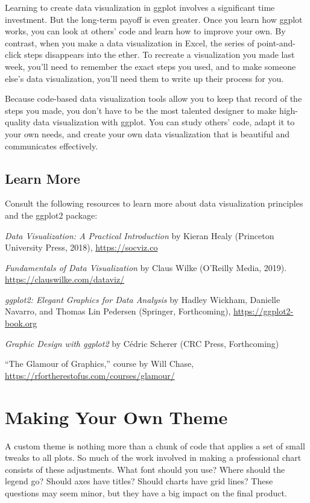 \documentclass[
]{book}
\begin{document}
Learning to create data visualization in ggplot involves a significant time investment. But the long-term payoff is even greater. Once you learn how ggplot works, you can look at others' code and learn how to improve your own. By contrast, when you make a data visualization in Excel, the series of point-and-click steps disappears into the ether. To recreate a visualization you made last week, you'll need to remember the exact steps you used, and to make someone else's data visualization, you'll need them to write up their process for you.

Because code-based data visualization tools allow you to keep that record of the steps you made, you don't have to be the most talented designer to make high-quality data visualization with ggplot. You can study others' code, adapt it to your own needs, and create your own data visualization that is beautiful and communicates effectively.

\hypertarget{learn-more-1}{%
\section*{Learn More}\label{learn-more-1}}

Consult the following resources to learn more about data visualization principles and the ggplot2 package:

\emph{Data Visualization: A Practical Introduction} by Kieran Healy (Princeton University Press, 2018), \url{https://socviz.co}

\emph{Fundamentals of Data Visualization} by Claus Wilke (O'Reilly Media, 2019). \url{https://clauswilke.com/dataviz/}

\emph{ggplot2: Elegant Graphics for Data Analysis} by Hadley Wickham, Danielle Navarro, and Thomas Lin Pedersen (Springer, Forthcoming), \url{https://ggplot2-book.org}

\emph{Graphic Design with ggplot2} by Cédric Scherer (CRC Press, Forthcoming)

``The Glamour of Graphics,'' course by Will Chase, \url{https://rfortherestofus.com/courses/glamour/}

\hypertarget{custom-theme-chapter}{%
\chapter{Making Your Own Theme}\label{custom-theme-chapter}}

A custom theme is nothing more than a chunk of code that applies a set of small tweaks to all plots. So much of the work involved in making a professional chart consists of these adjustments. What font should you use? Where should the legend go? Should axes have titles? Should charts have grid lines? These questions may seem minor, but they have a big impact on the final product.
\end{document}

